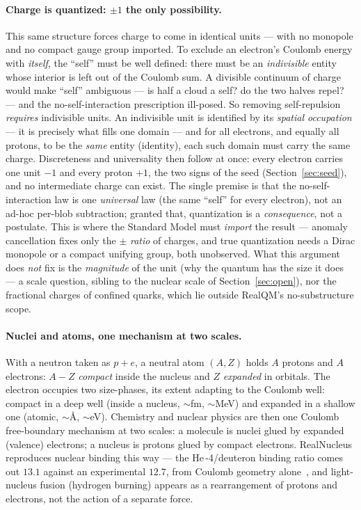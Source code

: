 \documentclass[11pt]{article}
\begin{document}
\paragraph{Charge is quantized: $\pm1$ the only possibility.} This same structure forces charge to come in
identical units --- with no monopole and no compact gauge group imported. To exclude an electron's Coulomb energy
with \emph{itself}, the ``self'' must be well defined: there must be an \emph{indivisible} entity whose interior is
left out of the Coulomb sum. A divisible continuum of charge would make ``self'' ambiguous --- is half a cloud a
self? do the two halves repel? --- and the no-self-interaction prescription ill-posed. So removing self-repulsion
\emph{requires} indivisible units. An indivisible unit is identified by its \emph{spatial occupation} --- it is
precisely what fills one domain --- and for all electrons, and equally all protons, to be the \emph{same} entity
(identity), each such domain must carry the same charge. Discreteness and universality then follow at once: every
electron carries one unit $-1$ and every proton $+1$, the two signs of the seed (Section~\ref{sec:seed}), and no
intermediate charge can exist. The single premise is that the no-self-interaction law is one
\emph{universal} law (the same ``self'' for every electron), not an ad-hoc per-blob subtraction; granted that,
quantization is a \emph{consequence}, not a postulate. This is where the Standard Model must \emph{import} the
result --- anomaly cancellation fixes only the $\pm$ \emph{ratio} of charges, and true quantization needs a Dirac
monopole or a compact unifying group, both unobserved. What this argument does \emph{not} fix is the
\emph{magnitude} of the unit (why the quantum has the size it does --- a scale question, sibling to the nuclear
scale of Section~\ref{sec:open}), nor the fractional charges of confined quarks, which lie outside RealQM's
no-substructure scope.

\paragraph{Nuclei and atoms, one mechanism at two scales.} With a neutron taken as $p+e$, a neutral atom $(A,Z)$
holds $A$ protons and $A$ electrons: $A-Z$ \emph{compact} inside the nucleus and $Z$ \emph{expanded} in orbitals.
The electron occupies two size-phases, its extent adapting to the Coulomb well: compact in a deep well (inside a
nucleus, ${\sim}$fm, ${\sim}$MeV) and expanded in a shallow one (atomic, ${\sim}$\AA, ${\sim}$eV). Chemistry and
nuclear physics are then one Coulomb free-boundary mechanism at two scales: a molecule is nuclei glued by expanded
(valence) electrons; a nucleus is protons glued by compact electrons. RealNucleus reproduces nuclear binding this
way --- the He\,-4/deuteron binding ratio comes out $13.1$ against an experimental $12.7$, from Coulomb geometry
alone~\cite{realnucleus}, and light-nucleus fusion (hydrogen burning) appears as a rearrangement of protons and
electrons, not the action of a separate force.
\end{document}
